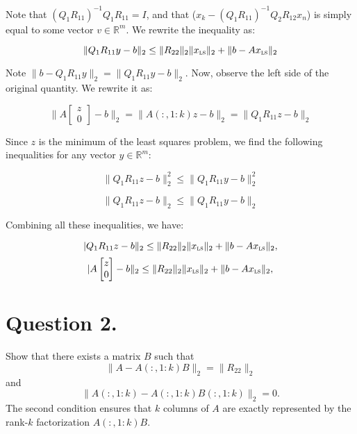 \documentclass[12pt]{article}
\newcommand{\ls}{\textsc{ls}}
\newcommand{\R}{\mathbb{R}}
\begin{document}
Note that $(Q_1R_{11})^{-1}Q_1R_{11} = I$, and that ($x_k - (Q_1R_{11})^{-1}Q_2R_{12}x_n$) is simply equal to some vector $v \in \R^m$. We rewrite the inequality as:

$$\|Q_1R_{11}y - b\|_2 \leq \|R_{22}\|_2\|x_{\ls}\|_2 + \|b-Ax_{\ls}\|_2$$

Note $\|b - Q_1R_{11}y\|_2 = \|Q_1R_{11}y - b\|_2$. Now, observe the left side of the original quantity. We rewrite it as:

$$\|A\begin{bmatrix}z \\ 0\end{bmatrix}-b\|_2 = \|A(:,1:k)z - b\|_2 = \|Q_1R_{11}z - b\|_2$$

Since $z$ is the minimum of the least squares problem, we find the following inequalities for any vector $y \in \R^m$:

$$\|Q_1R_{11}z - b\|^2_2 \leq \|Q_1R_{11}y - b\|^2_2$$

$$\|Q_1R_{11}z - b\|_2 \leq \|Q_1R_{11}y - b\|_2$$

Combining all these inequalities, we have:

$$|Q_1R_{11}z-b\|_2 \leq \|R_{22}\|_2\|x_{\ls}\|_2 + \|b-Ax_{\ls}\|_2,$$
$$|A\begin{bmatrix}z \\ 0\end{bmatrix}-b\|_2 \leq \|R_{22}\|_2\|x_{\ls}\|_2 + \|b-Ax_{\ls}\|_2,$$


\section*{Question 2.}
Show that there exists a matrix $B$ such that
\[
    \|A - A(:,1:k)B\|_2 = \|R_{22}\|_2
\]
and 
\[
    \|A(:,1:k) - A(:,1:k)B(:,1:k)\|_2 = 0.
\]
The second condition ensures that $k$ columns of $A$ are exactly represented by the rank-$k$ factorization $A(:,1:k)B.$
\end{document}
